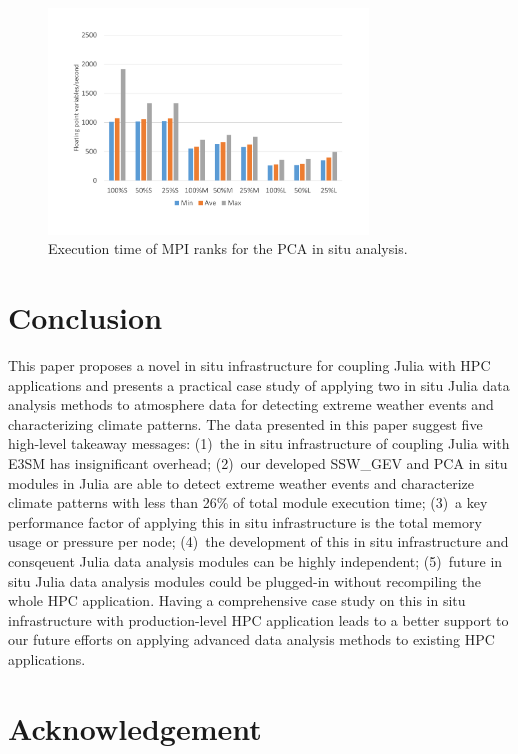 \documentclass{juliacon}
\begin{document}
\begin{figure}
    \centering
    \includegraphics[width=\linewidth, height=6cm]{figures/pca_outliers.pdf}
    \caption{Execution time of MPI ranks for the PCA in situ analysis.}
    \label{fig:pca_outliers}
\end{figure}







\section{Conclusion} \label{sec6}



This paper proposes a novel in situ infrastructure for coupling Julia with HPC applications and presents a practical case study of applying two in situ Julia data analysis methods to atmosphere data for detecting extreme weather events and characterizing climate patterns. The data presented in this paper suggest five high-level takeaway messages: (1)~the in situ infrastructure of coupling Julia with E3SM has insignificant overhead; (2)~our developed SSW\_GEV and PCA in situ modules in Julia are able to detect extreme weather events and characterize climate patterns with less than 26\% of total module execution time; (3)~a key performance factor of applying this in situ infrastructure is the total memory usage or pressure per node; (4)~the development of this in situ infrastructure and consqeuent Julia data analysis modules can be highly independent; (5)~future in situ Julia data analysis modules could be plugged-in without recompiling the whole HPC application. Having a comprehensive case study on this in situ infrastructure with production-level HPC application leads to a better support to our future efforts on applying advanced data analysis methods to existing HPC applications.


\section*{Acknowledgement}
\end{document}
